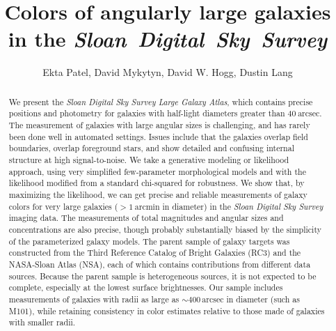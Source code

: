 \documentclass[12pt,preprint,pdftex]{aastex}
\newcounter{address}
\newcommand{\project}[1]{\textsl{#1}}
\newcommand{\units}[1]{\mathrm{#1}}
\renewcommand{\arcmin}{\units{arcmin}}
\renewcommand{\arcsec}{\units{arcsec}}
\begin{document}
\title{
       Colors of angularly large galaxies in the \project{Sloan~Digital~Sky~Survey}
      }
\author{
        Ekta Patel\altaffilmark{\ref{CCPP}},
        David Mykytyn\altaffilmark{\ref{CCPP}},
        David W. Hogg\altaffilmark{\ref{CCPP},\ref{MPIA},\ref{email}},
        Dustin Lang\altaffilmark{\ref{CMU}}
       }
\setcounter{address}{1}

\begin{abstract}
We present the \project{Sloan Digital Sky Survey Large Galaxy Atlas},
which contains precise positions and photometry for galaxies with
half-light diameters greater than $40~\arcsec$. The measurement of
galaxies with large angular sizes is challenging, and has rarely been
done well in automated settings.  Issues include that the galaxies
overlap field boundaries, overlap foreground stars, and show detailed
and confusing internal structure at high signal-to-noise.  We take a
generative modeling or likelihood approach, using very simplified
few-parameter morphological models and with the likelihood modified
from a standard chi-squared for robustness.  We show that, by
maximizing the likelihood, we can get precise and reliable
measurements of galaxy colors for very large galaxies ($>1~\arcmin$ in
diameter) in the \project{Sloan Digital Sky Survey} imaging data.  The
measurements of total magnitudes and angular sizes and concentrations
are also precise, though probably substantially biased by the
simplicity of the parameterized galaxy models.  The parent sample of
galaxy targets was constructed from the Third Reference Catalog of
Bright Galaxies (RC3) and the NASA-Sloan Atlas (NSA), each of which
contains contributions from different data sources. Because the parent
sample is heterogeneous sources, it is not expected to be complete,
especially at the lowest surface brightnesses.  Our sample includes
measurements of galaxies with radii as large as $\sim 400\,\arcsec$ in
diameter (such as M101), while retaining consistency in color
estimates relative to those made of galaxies with smaller radii.
\end{abstract}
\end{document}
